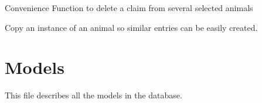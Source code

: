 \documentclass[letterpaper,10pt,openany,oneside,english]{sphinxmanual}
\begin{document}

\begin{fulllineitems}
\label{\detokenize{index:animals.admin.clear_claim}}
Convenience Function to delete a claim from several selected animals

\end{fulllineitems}


\begin{fulllineitems}
\label{\detokenize{index:animals.admin.copy_animal}}
Copy an instance of an animal so similar entries can be easily created.

\end{fulllineitems}



\section{Models}
\label{\detokenize{index:module-animals.models}}\label{\detokenize{index:models}}
This file describes all the models in the database.
\end{document}
